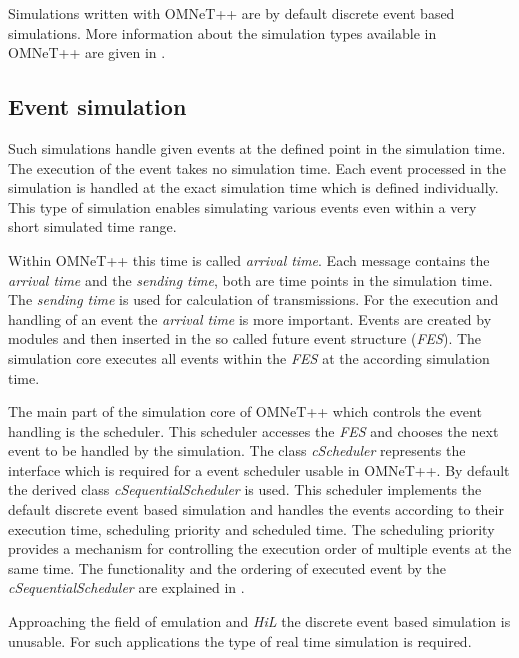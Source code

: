 \documentclass[journal]{IEEEtran}
\begin{document}
Simulations written with OMNeT++ are by default discrete event based simulations.
More information about the simulation types available in OMNeT++ are given in \cite[section 4.1]{OMNETMANUAL}.

\subsection{Event simulation}
\label{sec:EventSimulation}
Such simulations handle given events at the defined point in the simulation time.
The execution of the event takes no simulation time.
Each event processed in the simulation is handled at the exact simulation time which is defined individually.
This type of simulation enables simulating various events even within a very short simulated time range.

Within OMNeT++ this time is called \emph{arrival time}.
Each message contains the \emph{arrival time} and the \emph{sending time}, both are time points in the simulation time.
The \emph{sending time} is used for calculation of transmissions.
For the execution and handling of an event the \emph{arrival time} is more important.
Events are created by modules and then inserted in the so called future event structure (\emph{FES}).
The simulation core executes all events within the \emph{FES} at the according simulation time.

The main part of the simulation core of OMNeT++ which controls the event handling is the scheduler.
This scheduler accesses the \emph{FES} and chooses the next event to be handled by the simulation.
The class \emph{cScheduler} represents the interface which is required for a event scheduler usable in OMNeT++.
By default the derived class \emph{cSequentialScheduler} is used.
This scheduler implements the default discrete event based simulation and handles the events according to their execution time, scheduling priority and scheduled time.
The scheduling priority provides a mechanism for controlling the execution order of multiple events at the same time.
The functionality and the ordering of executed event by the \emph{cSequentialScheduler} are explained in \cite[section 4.1]{OMNETMANUAL}.

Approaching the field of emulation and \emph{HiL} the discrete event based simulation is unusable.
For such applications the type of real time simulation is required.
\end{document}
